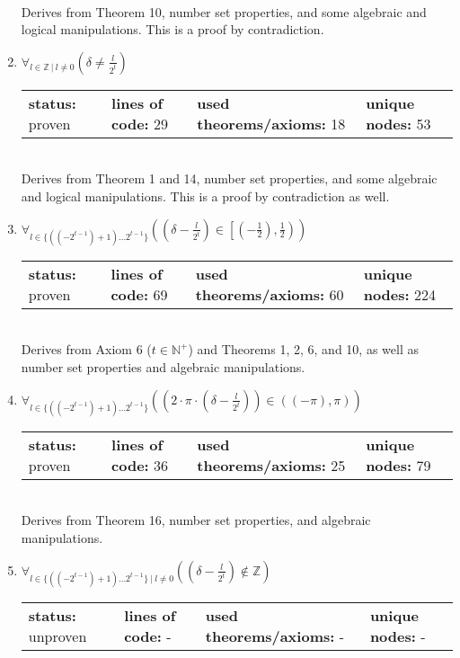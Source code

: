 \documentclass{article}[12pt]
\begin{document}
\begin{enumerate}
\begin{tabular}{l | l | l | l}
  \end{tabular} \hfill \\
Derives from Theorem 10, number set properties, and some algebraic and logical manipulations.  This is a proof by contradiction.
\item $\forall_{l \in \mathbb{Z}~|~l \neq 0} \left(\delta \neq \frac{l}{2^{t}}\right)$ \hfill \\
  \begin{tabular}{l | l | l | l}
    \textbf{status:} proven & \textbf{lines of code:} 29 & \textbf{used theorems/axioms:} 18 & \textbf{unique nodes:} 53
  \end{tabular} \hfill \\
Derives from Theorem 1 and 14, number set properties, and some algebraic and logical manipulations.  This is a proof by contradiction as well.
\item $\forall_{l \in \{\left(\left(-2^{t - 1}\right) + 1\right)\ldots 2^{t - 1}\}} \left(\left(\delta - \frac{l}{2^{t}}\right) \in \left[\left(-\frac{1}{2}\right),\frac{1}{2}\right)\right)$ \hfill \\
  \begin{tabular}{l | l | l | l}
    \textbf{status:} proven & \textbf{lines of code:} 69 & \textbf{used theorems/axioms:} 60 & \textbf{unique nodes:} 224
  \end{tabular} \hfill \\
Derives from Axiom 6 ($t \in \mathbb{N}^+$) and Theorems 1, 2, 6, and 10, as well as number set properties and algebraic manipulations. 
\item $\forall_{l \in \{\left(\left(-2^{t - 1}\right) + 1\right)\ldots 2^{t - 1}\}} \left(\left(2 \cdot \pi \cdot \left(\delta - \frac{l}{2^{t}}\right)\right) \in \left(\left(-\pi\right),\pi\right)\right)$ \hfill \\
  \begin{tabular}{l | l | l | l}
    \textbf{status:} proven & \textbf{lines of code:} 36 & \textbf{used theorems/axioms:} 25 & \textbf{unique nodes:} 79
  \end{tabular} \hfill \\
Derives from Theorem 16, number set properties, and algebraic manipulations.
\item $\forall_{l \in \{\left(\left(-2^{t - 1}\right) + 1\right)\ldots 2^{t - 1}\}~|~l \neq 0} \left(\left(\delta - \frac{l}{2^{t}}\right) \notin \mathbb{Z}\right)$ \hfill \\
  \begin{tabular}{l | l | l | l}
    \textbf{status:} unproven & \textbf{lines of code:} - & \textbf{used theorems/axioms:} - & \textbf{unique nodes:} -

\end{tabular}
\end{enumerate}
\end{document}
